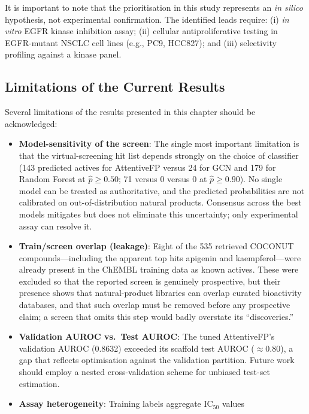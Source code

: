 It is important to note that the prioritisation in this study represents an
\textit{in silico} hypothesis, not experimental confirmation. The identified leads
require: (i) \textit{in vitro} EGFR kinase inhibition assay; (ii) cellular
antiproliferative testing in EGFR-mutant NSCLC cell lines (e.g., PC9, HCC827);
and (iii) selectivity profiling against a kinase panel.

\subsection{Limitations of the Current Results}

Several limitations of the results presented in this chapter should be acknowledged:

\begin{itemize}
    \item \textbf{Model-sensitivity of the screen}: The single most important
          limitation is that the virtual-screening hit list depends strongly on the
          choice of classifier (143 predicted actives for AttentiveFP versus 24 for
          GCN and 179 for Random Forest at $\hat{p} \geq 0.50$; 71 versus 0 versus 0
          at $\hat{p} \geq 0.90$). No single model can be treated as authoritative,
          and the predicted probabilities are not calibrated on out-of-distribution
          natural products. Consensus across the best models mitigates but does not
          eliminate this uncertainty; only experimental assay can resolve it.
    \item \textbf{Train/screen overlap (leakage)}: Eight of the 535 retrieved
          COCONUT compounds---including the apparent top hits apigenin and
          kaempferol---were already present in the ChEMBL training data as known
          actives. These were excluded so that the reported screen is genuinely
          prospective, but their presence shows that natural-product libraries can
          overlap curated bioactivity databases, and that such overlap must be removed
          before any prospective claim; a screen that omits this step would badly
          overstate its ``discoveries.''
    \item \textbf{Validation AUROC vs.\ Test AUROC}: The tuned AttentiveFP's
          validation AUROC (0.8632) exceeded its scaffold test AUROC ($\approx$0.80),
          a gap that reflects optimisation against the validation partition. Future
          work should employ a nested cross-validation scheme for unbiased test-set
          estimation.
    \item \textbf{Assay heterogeneity}: Training labels aggregate IC$_{50}$ values

\end{itemize}
